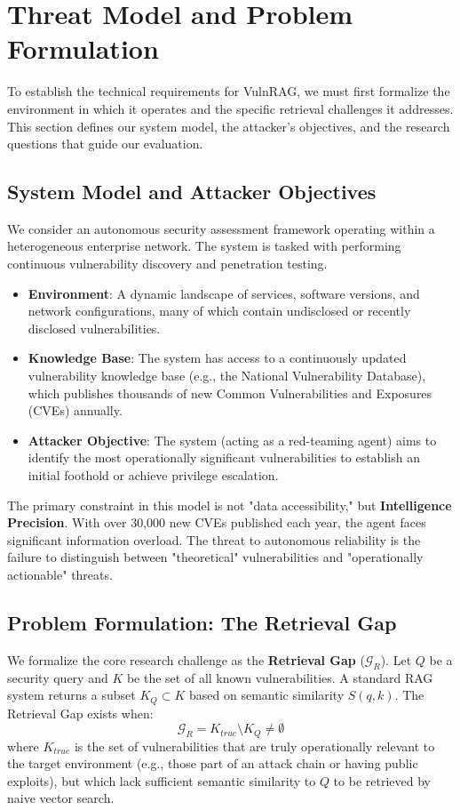 \section{Threat Model and Problem Formulation}
\label{sec:threat}

To establish the technical requirements for VulnRAG, we must first formalize the environment in which it operates and the specific retrieval challenges it addresses. This section defines our system model, the attacker’s objectives, and the research questions that guide our evaluation.

\subsection{System Model and Attacker Objectives}
We consider an autonomous security assessment framework operating within a heterogeneous enterprise network. The system is tasked with performing continuous vulnerability discovery and penetration testing.
\begin{itemize}
    \item \textbf{Environment}: A dynamic landscape of services, software versions, and network configurations, many of which contain undisclosed or recently disclosed vulnerabilities.
    \item \textbf{Knowledge Base}: The system has access to a continuously updated vulnerability knowledge base (e.g., the National Vulnerability Database), which publishes thousands of new Common Vulnerabilities and Exposures (CVEs) annually.
    \item \textbf{Attacker Objective}: The system (acting as a red-teaming agent) aims to identify the most operationally significant vulnerabilities to establish an initial foothold or achieve privilege escalation.
\end{itemize}

The primary constraint in this model is not "data accessibility," but \textbf{Intelligence Precision}. With over 30,000 new CVEs published each year, the agent faces significant information overload. The threat to autonomous reliability is the failure to distinguish between "theoretical" vulnerabilities and "operationally actionable" threats.

\subsection{Problem Formulation: The Retrieval Gap}
We formalize the core research challenge as the \textbf{Retrieval Gap} ($\mathcal{G}_R$). Let $Q$ be a security query and $K$ be the set of all known vulnerabilities. A standard RAG system returns a subset $K_Q \subset K$ based on semantic similarity $S(q, k)$. The Retrieval Gap exists when:
\begin{equation}
\mathcal{G}_R = K_{true} \setminus K_Q \neq \emptyset
\end{equation}
where $K_{true}$ is the set of vulnerabilities that are truly operationally relevant to the target environment (e.g., those part of an attack chain or having public exploits), but which lack sufficient semantic similarity to $Q$ to be retrieved by naive vector search.

